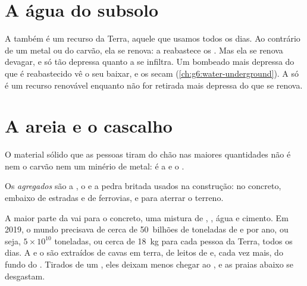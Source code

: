 \section{A água do subsolo}

A  também é um recurso da Terra, aquele que usamos todos
os dias. Ao contrário de um metal ou do carvão, ela se renova: a 
reabastece os . Mas ela se renova devagar, e só tão depressa
quanto a  se infiltra. Um  bombeado mais depressa do que é
reabastecido vê o seu  baixar, e os  secam
(\cref{ch:g6:water-underground}). A  só é um recurso
renovável enquanto não for retirada mais depressa do que se renova.

\section{A areia e o cascalho}

O material sólido que as pessoas tiram do chão nas maiores quantidades
não é nem o carvão nem um minério de metal: é a  e o .

\begin{definition}[Agregado]\label{def:g9:earth-resources:aggregate}
Os \emph{agregados} são a , o  e a pedra
britada usados na construção: no concreto, embaixo de estradas e de
ferrovias, e para aterrar o terreno.
\end{definition}

A maior parte da  vai para o concreto, uma mistura de ,
, água e cimento. Em 2019, o mundo precisava de cerca de
50~bilhões de toneladas de  e  por ano, ou seja,
$5 \times 10^{10}$ toneladas, ou cerca de \qty{18}{kg} para cada pessoa
da Terra, todos os dias. A  e o  são extraídos de cavas em
terra, de leitos de  e, cada vez mais, do fundo do . Tirados de
um , eles deixam menos  chegar ao , e as praias  abaixo
se desgastam.

